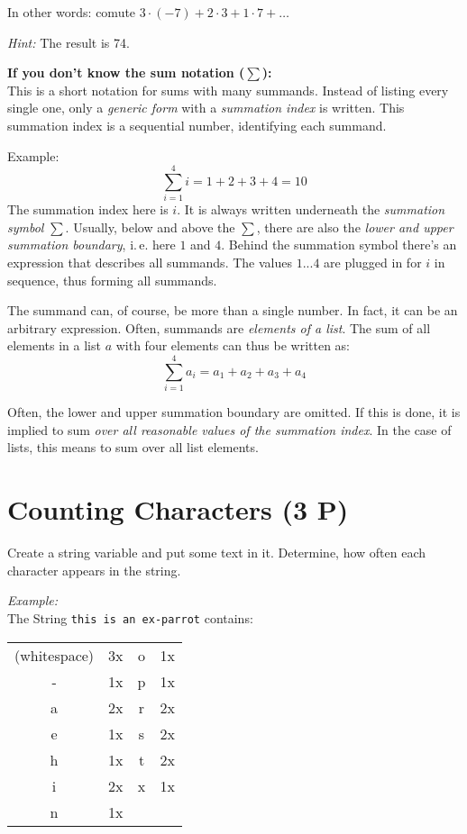 \documentclass[
	ngerman,
	fontsize=10pt,
	parskip=half,
	titlepage=true,
	DIV=12
]{scrartcl}
\newcommand*{\ie}{i.\,e. }
\begin{document}
In other words: comute $3 \cdot (-7) + 2 \cdot 3 + 1 \cdot 7 + \ldots$

\emph{Hint:} The result is 74.

\textbf{If you don't know the sum notation ($\sum$):}\\
This is a short notation for sums with many summands. Instead of listing every single one, only a \emph{generic form} with a \emph{summation index} is written. This summation index is a sequential number, identifying each summand.

Example:
\[\sum_{i=1}^4 i = 1 + 2 + 3 + 4 = 10 \]
The summation index here is $i$. It is always written underneath the \emph{summation symbol} $\sum$. Usually, below and above the $\sum$, there are also the \emph{lower and upper summation boundary}, \ie here $1$ and $4$. Behind the summation symbol there's an expression that describes all summands. The values $1 ... 4$ are plugged in for $i$ in sequence, thus forming all summands.

The summand can, of course, be more than a single number. In fact, it can be an arbitrary expression. Often, summands are \emph{elements of a list}. The sum of all elements in a list $a$ with four elements can thus be written as:
\[ \sum_{i=1}^4 a_i = a_1 + a_2 + a_3 + a_4 \]

Often, the lower and upper summation boundary are omitted. If this is done, it is implied to sum \emph{over all reasonable values of the summation index}. In the case of lists, this means to sum over all list elements.


\section{Counting Characters (3 P)}
Create a string variable and put some text in it. Determine, how often each character appears in the string.

\emph{Example:}\\
The String \texttt{this is an ex-parrot} contains:
\begin{center}
\begin{tabular}{cc|cc}
(whitespace) & 3x & o            & 1x \\
-            & 1x & p            & 1x \\
a            & 2x & r            & 2x \\
e            & 1x & s            & 2x \\
h            & 1x & t            & 2x \\
i            & 2x & x            & 1x \\
n            & 1x 
\end{tabular}
\end{center}
\end{document}
